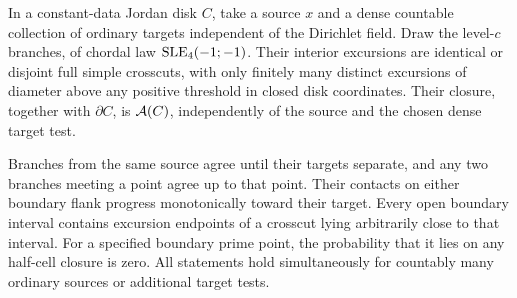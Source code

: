 \begin{lemma}\label{wall:fan}
In a constant-data Jordan disk $C$, take a source $x$ and a dense countable collection of ordinary targets independent of the Dirichlet field.  Draw the level-$c$ branches, of chordal law $\mathrm{SLE}_4(-1;-1)$.  Their interior excursions are identical or disjoint full simple crosscuts, with only finitely many distinct excursions of diameter above any positive threshold in closed disk coordinates.  Their closure, together with $\partial C$, is $\mathcal A(C)$, independently of the source and the chosen dense target test.

Branches from the same source agree until their targets separate, and any two branches meeting a point agree up to that point.  Their contacts on either boundary flank progress monotonically toward their target.  Every open boundary interval contains excursion endpoints of a crosscut lying arbitrarily close to that interval.  For a specified boundary prime point, the probability that it lies on any half-cell closure is zero.  All statements hold simultaneously for countably many ordinary sources or additional target tests.
\end{lemma}

